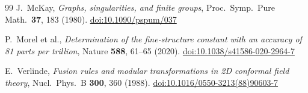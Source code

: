 \documentclass[11pt,a4paper]{article}
\theoremstyle{definition}
\theoremstyle{remark}
\begin{document}
\begin{thebibliography}{99}
J.~McKay,
\textit{Graphs, singularities, and finite groups},
Proc.\ Symp.\ Pure Math.\ \textbf{37}, 183 (1980).
\href{https://doi.org/10.1090/pspum/037}{doi:10.1090/pspum/037}

P.~Morel et al.,
\textit{Determination of the fine-structure constant with an accuracy of 81 parts per trillion},
Nature \textbf{588}, 61--65 (2020).
\href{https://doi.org/10.1038/s41586-020-2964-7}{doi:10.1038/s41586-020-2964-7}

E.~Verlinde,
\textit{Fusion rules and modular transformations in 2D conformal field theory},
Nucl.\ Phys.\ B \textbf{300}, 360 (1988).
\href{https://doi.org/10.1016/0550-3213(88)90603-7}{doi:10.1016/0550-3213(88)90603-7}

\end{thebibliography}
\end{document}
